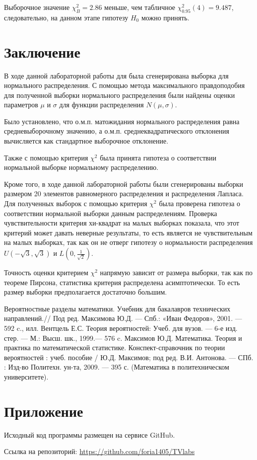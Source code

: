 \documentclass[12pt]{article}
\begin{document}
	
		Выборочное значение $\chi_{B}^2 = 2.86$ меньше, чем табличное   $\chi_{0.95}^2(4)=9.487$, следовательно, на данном этапе гипотезу $H_0$ можно принять.

\newpage
 \section*{Заключение}
{}

В ходе данной лабораторной работы для была сгенерирована выборка для нормального распределения. С помощью метода максимального правдоподобия для полученной выборки нормального распределения были найдены оценки параметров $\mu$ и $\sigma$ для функции распределения $N(\mu, \sigma)$. 
\par Было установлено, что о.м.п. матожидания нормального распределения равна средневыборочному значению, а о.м.п. среднеквадратического отклонения вычисляется как стандартное выборочное отклонение. 
\par Также с помощью критерия $\chi^2$ была принята гипотеза о соответствии нормальной выборке нормальному распределению.
	
	Кроме того, в ходе данной лабораторной работы были сгенерированы выборки размером 20 элементов равномерного распределения и распределения Лапласа. Для полученных выборок с помощью критерия $\chi^2$ была проверена гипотеза о соответствии нормальной выборки данным распределениям. 
	Проверка чувствительности критерия хи-квадрат на малых выборках показала, что этот критерий может давать неверные результаты, то есть является не чувствительным на малых выборках, так как он не отверг гипотезу о нормальности распределения $U(-\sqrt{3}, \sqrt{3})$ и $L(0, \frac{1}{\sqrt{2}})$.
	
Точность оценки критерием $\chi^2$ напрямую зависит от размера выборки, так как по теореме Пирсона, статистика критерия распределена асимптотически. То есть размер выборки предполагается достаточно большим.

\newpage





\begin{thebibliography}{}
	  Вероятностные разделы математики. Учебник для бакалавров технических направлений.// Под ред. Максимова Ю.Д. — Спб.: «Иван Федоров», 2001. — 592 c., илл.
	  Вентцель Е.С. Теория вероятностей: Учеб. для вузов. — 6-е изд. стер. — М.: Высш. шк., 1999.— 576 c.
	  Максимов Ю.Д. Математика. Теория и практика по математической статистике. Конспект-справочник по теории вероятностей : учеб. пособие / Ю.Д. Максимов; под ред. В.И. Антонова. — СПб. : Изд-во Политехн. ун-та, 2009. — 395 с. (Математика в политехническом университете).
\end{thebibliography}
\newpage
\appendix


\section{Приложение}
\label{sec:A}
\par Исходный код программы размещен на сервисе GitHub.
\par Ссылка на репозиторий: \url{https://github.com/foria1405/TVlabs}
\end{document}

